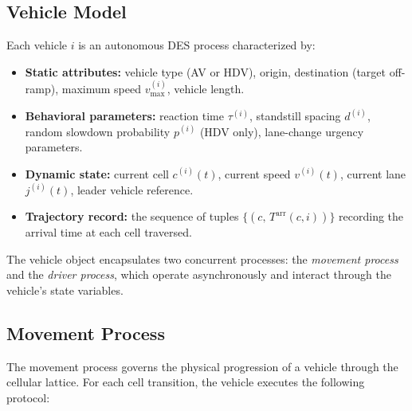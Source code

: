 \documentclass[review,authoryear]{elsarticle}
\newcommand{\Tarr}{T^{\text{arr}}}
\begin{document}
\subsection{Vehicle Model}
\label{sec:vehicle}

Each vehicle $i$ is an autonomous DES process characterized by:

\begin{itemize}
    \item \textbf{Static attributes:} vehicle type (AV or HDV), origin, destination (target off-ramp), maximum speed $v_{\max}^{(i)}$, vehicle length.

    \item \textbf{Behavioral parameters:} reaction time $\tau^{(i)}$, standstill spacing $d^{(i)}$, random slowdown probability $p^{(i)}$ (HDV only), lane-change urgency parameters.

    \item \textbf{Dynamic state:} current cell $c^{(i)}(t)$, current speed $v^{(i)}(t)$, current lane $j^{(i)}(t)$, leader vehicle reference.

    \item \textbf{Trajectory record:} the sequence of tuples $\{(c,\, \Tarr(c, i))\}$ recording the arrival time at each cell traversed.
\end{itemize}

The vehicle object encapsulates two concurrent processes: the \emph{movement process} and the \emph{driver process}, which operate asynchronously and interact through the vehicle's state variables.

\subsection{Movement Process}
\label{sec:movement}

The movement process governs the physical progression of a vehicle through the cellular lattice. For each cell transition, the vehicle executes the following protocol:
\end{document}
